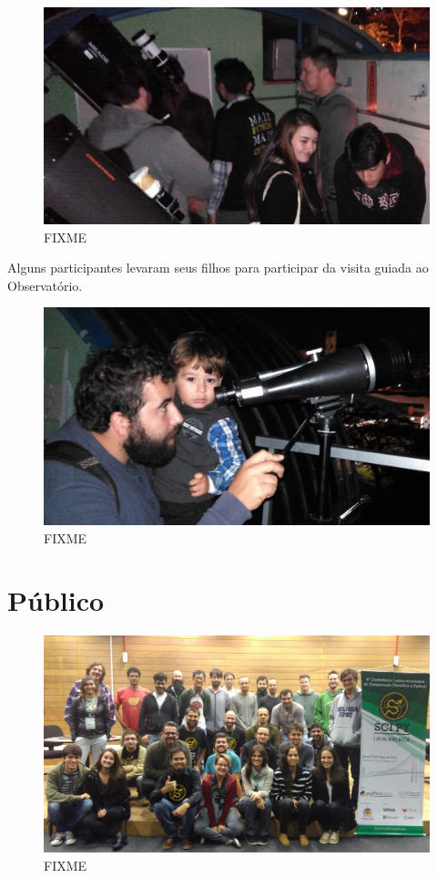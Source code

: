 \documentclass[12pt]{article}
\begin{document}
\begin{figure}[!htb]
\center
\includegraphics[height=.3\textheight]{social-astro.jpg}
\caption{FIXME}
\end{figure}

Alguns participantes levaram seus filhos para participar da visita guiada ao
Observatório.

\begin{figure}[!htb]
\center
\includegraphics[height=.3\textheight]{social-family.jpg}
\caption{FIXME}
\end{figure}

\clearpage
\newpage

\section*{Público}

\begin{figure}[!htb]
\center
\includegraphics[height=.3\textheight]{group.jpg}
\caption{FIXME}
\end{figure}
\end{document}
